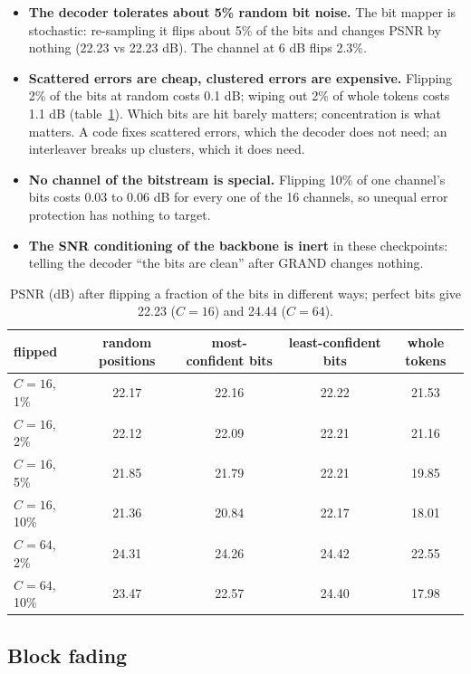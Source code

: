 \documentclass{article}
\begin{document}
\begin{conceptbox}[title=Four facts about the semantic decoder]
\begin{itemize}
\item \textbf{The decoder tolerates about 5\% random bit noise.} The bit mapper is stochastic:
re-sampling it flips about 5\% of the bits and changes PSNR by nothing (22.23 vs 22.23 dB). The channel
at 6 dB flips 2.3\%.
\item \textbf{Scattered errors are cheap, clustered errors are expensive.} Flipping 2\% of the bits at
random costs 0.1 dB; wiping out 2\% of whole tokens costs 1.1 dB (table~\ref{tab:flips}). Which bits are
hit barely matters; concentration is what matters. A code fixes scattered errors, which the decoder does
not need; an interleaver breaks up clusters, which it does need.
\item \textbf{No channel of the bitstream is special.} Flipping 10\% of one channel's bits costs 0.03 to
0.06 dB for every one of the 16 channels, so unequal error protection has nothing to target.
\item \textbf{The SNR conditioning of the backbone is inert} in these checkpoints: telling the decoder
``the bits are clean'' after GRAND changes nothing.
\end{itemize}
\end{conceptbox}

\begin{table}[H]
\centering\small
\begin{tabular}{lcccc}
\toprule
flipped & random positions & most-confident bits & least-confident bits & whole tokens \\
\midrule
$C=16$, 1\% & 22.17 & 22.16 & 22.22 & 21.53 \\
$C=16$, 2\% & 22.12 & 22.09 & 22.21 & 21.16 \\
$C=16$, 5\% & 21.85 & 21.79 & 22.21 & 19.85 \\
$C=16$, 10\% & 21.36 & 20.84 & 22.17 & 18.01 \\
$C=64$, 2\% & 24.31 & 24.26 & 24.42 & 22.55 \\
$C=64$, 10\% & 23.47 & 22.57 & 24.40 & 17.98 \\
\bottomrule
\end{tabular}
\caption{PSNR (dB) after flipping a fraction of the bits in different ways; perfect bits give 22.23 ($C=16$) and 24.44 ($C=64$).}
\label{tab:flips}
\end{table}

\subsection{Block fading}
\end{document}
